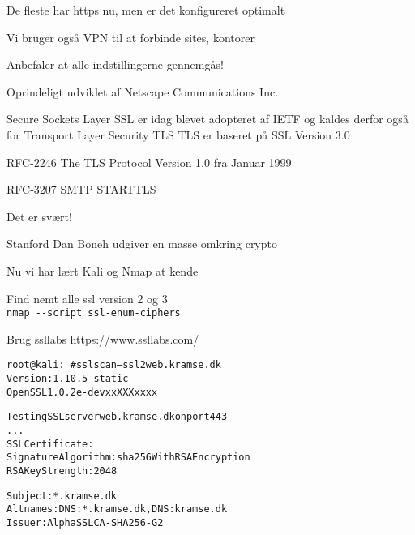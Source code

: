 \documentclass[Screen16to9,17pt]{foils}
\begin{document}
\begin{list2}
\item De fleste har https nu, men er det konfigureret optimalt
\item Vi bruger også VPN til at forbinde sites, kontorer
\item Anbefaler at alle indstillingerne gennemgås!
\end{list2}




\begin{list1}
\item Oprindeligt udviklet af Netscape Communications Inc.
\item Secure Sockets Layer SSL er idag blevet adopteret af IETF og kaldes
derfor også for Transport Layer Security TLS
TLS er baseret på SSL Version 3.0
\item RFC-2246 The TLS Protocol Version 1.0 fra Januar 1999
\item RFC-3207 SMTP STARTTLS
\item Det er svært!
\item Stanford Dan Boneh udgiver en masse omkring crypto\\ 
\end{list1}



\begin{list1}
\item Nu vi har lært Kali og Nmap at kende
\begin{list2}
\item Find nemt alle ssl version 2 og 3\\
\verb+nmap --script ssl-enum-ciphers+
\item Brug ssllabs https://www.ssllabs.com/
\end{list2}
\end{list1}



\begin{alltt}\small
root@kali:~# sslscan --ssl2 web.kramse.dk
Version: 1.10.5-static
OpenSSL 1.0.2e-dev xx XXX xxxx

Testing SSL server web.kramse.dk on port 443
...
  SSL Certificate:
Signature Algorithm: sha256WithRSAEncryption
RSA Key Strength:    2048

Subject:  *.kramse.dk
Altnames: DNS:*.kramse.dk, DNS:kramse.dk
Issuer:   AlphaSSL CA - SHA256 - G2
\end{alltt}
\end{document}
